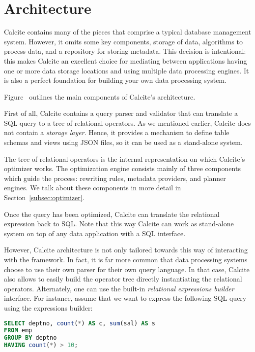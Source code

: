 \section{Architecture}
\label{sec:archi}

Calcite contains many of the pieces that comprise a typical database management system. However, it omits some key components, \eg storage of data, algorithms to process data, and a repository for storing metadata. This decision is intentional: this makes Calcite an excellent choice for mediating between applications having one or more data storage locations and using multiple data processing engines. It is also a perfect foundation for building your own data processing system.

Figure~ outlines the main components of Calcite's architecture.

First of all, Calcite contains a query parser and validator that can translate a SQL query to a tree of relational operators. As we mentioned earlier, Calcite does not contain a \textit{storage layer}. Hence, it provides a mechanism to define table schemas and views using JSON files, so it can be used as a stand-alone system.

The tree of relational operators is the internal representation on which Calcite's optimizer works. The optimization engine consists mainly of three components which guide the process: rewriting rules, metadata providers, and planner engines. We talk about these components in more detail in Section~\ref{subsec:optimizer}.

Once the query has been optimized, Calcite can translate the relational expression back to SQL. Note that this way Calcite can work as stand-alone system on top of any data application with a SQL interface.

However, Calcite architecture is not only tailored towards this way of interacting with the framework. In fact, it is far more common that data processing systems choose to use their own parser for their own query language. In that case, Calcite also allows to easily build the operator tree directly instantiating the relational operators. Alternately, one can use the built-in \textit{relational expressions builder} interface. For instance, assume that we want to express the following SQL query using the expressions builder:

\begin{lstlisting}[language=SQL]
SELECT deptno, count(*) AS c, sum(sal) AS s
FROM emp
GROUP BY deptno
HAVING count(*) > 10;
\end{lstlisting}

